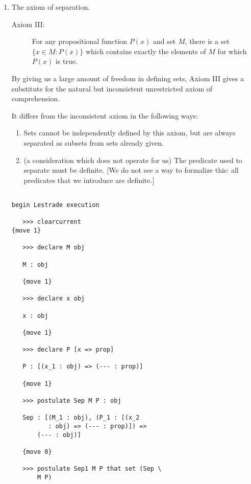\documentclass[12pt]{article}
\begin{document}
\begin{enumerate}
\item The axiom of separation.

\begin{description}

\item[Axiom III:]  For any propositional function $P(x)$ and set $M$, there is a set
$\{x \in M:P(x)\}$ which contains exactly the elements of $M$ for which $P(x)$ is true.

\end{description}

By giving us a large amount of freedom in defining sets, Axiom III gives a substitute for the natural but inconsistent unrestricted axiom of comprehension.

It differs from the inconsistent axiom in the following ways:

\begin{enumerate}

\item  Sets cannot be independently defined by this axiom, but are always separated as subsets from sets already given.

\item (a consideration which does not operate for us) The predicate used to separate must be definite.  [We do not see a way to formalize this:  all predicates that we introduce are definite.]

\end{enumerate}

\begin{verbatim}

begin Lestrade execution

   >>> clearcurrent
{move 1}

   >>> declare M obj

   M : obj

   {move 1}

   >>> declare x obj

   x : obj

   {move 1}

   >>> declare P [x => prop]

   P : [(x_1 : obj) => (--- : prop)]

   {move 1}

   >>> postulate Sep M P : obj

   Sep : [(M_1 : obj), (P_1 : [(x_2 
          : obj) => (--- : prop)]) => 
       (--- : obj)]

   {move 0}

   >>> postulate Sep1 M P that set (Sep \
       M P)


\end{verbatim}
\end{enumerate}
\end{document}
